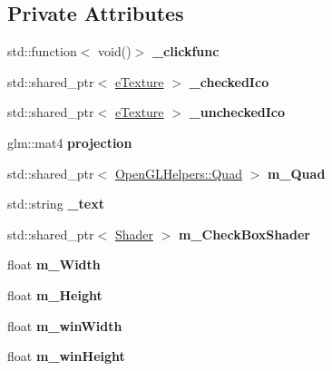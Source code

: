 \subsection*{Private Attributes}
\begin{DoxyCompactItemize}
\item 
std\+::function$<$ void()$>$ {\bfseries \+\_\+clickfunc}\hypertarget{class_check_box_af5af918560cc8733a4186a37af9d3ffc}{}\label{class_check_box_af5af918560cc8733a4186a37af9d3ffc}

\item 
std\+::shared\+\_\+ptr$<$ \hyperlink{classe_texture}{e\+Texture} $>$ {\bfseries \+\_\+checked\+Ico}\hypertarget{class_check_box_a57983f1421b9bdb7432fadb0d800dbfe}{}\label{class_check_box_a57983f1421b9bdb7432fadb0d800dbfe}

\item 
std\+::shared\+\_\+ptr$<$ \hyperlink{classe_texture}{e\+Texture} $>$ {\bfseries \+\_\+unchecked\+Ico}\hypertarget{class_check_box_ac2b7e23e182871b0b3c3f63b855dff38}{}\label{class_check_box_ac2b7e23e182871b0b3c3f63b855dff38}

\item 
glm\+::mat4 {\bfseries projection}\hypertarget{class_check_box_a9c7a7bbbdd801f86c54159dadf6761a9}{}\label{class_check_box_a9c7a7bbbdd801f86c54159dadf6761a9}

\item 
std\+::shared\+\_\+ptr$<$ \hyperlink{class_open_g_l_helpers_1_1_quad}{Open\+G\+L\+Helpers\+::\+Quad} $>$ {\bfseries m\+\_\+\+Quad}\hypertarget{class_check_box_a3eda2dffdfc108bcd052979c39ca061f}{}\label{class_check_box_a3eda2dffdfc108bcd052979c39ca061f}

\item 
std\+::string {\bfseries \+\_\+text}\hypertarget{class_check_box_adf8dfe43e7c761f7aa251c09d94536a6}{}\label{class_check_box_adf8dfe43e7c761f7aa251c09d94536a6}

\item 
std\+::shared\+\_\+ptr$<$ \hyperlink{class_shader}{Shader} $>$ {\bfseries m\+\_\+\+Check\+Box\+Shader}\hypertarget{class_check_box_a4f218da0aa68f868501e5a2c9194f4b2}{}\label{class_check_box_a4f218da0aa68f868501e5a2c9194f4b2}

\item 
float {\bfseries m\+\_\+\+Width}\hypertarget{class_check_box_a0ee5ae038afa76d504d657679e59b379}{}\label{class_check_box_a0ee5ae038afa76d504d657679e59b379}

\item 
float {\bfseries m\+\_\+\+Height}\hypertarget{class_check_box_ac89b5a9f404e10620e7451f22572c717}{}\label{class_check_box_ac89b5a9f404e10620e7451f22572c717}

\item 
float {\bfseries m\+\_\+win\+Width}\hypertarget{class_check_box_a532007421507bd6d4e7c71f1e788980f}{}\label{class_check_box_a532007421507bd6d4e7c71f1e788980f}

\item 
float {\bfseries m\+\_\+win\+Height}\hypertarget{class_check_box_a93bbceb8e7558727c7607b4b45f90305}{}\label{class_check_box_a93bbceb8e7558727c7607b4b45f90305}

\end{DoxyCompactItemize}

